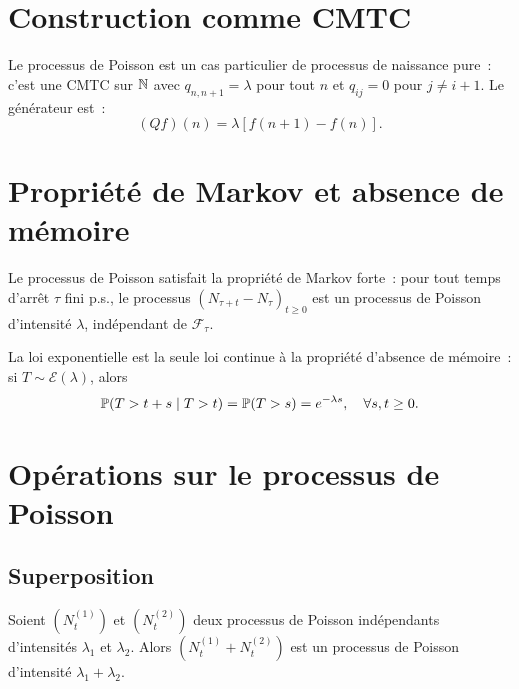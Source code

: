 \section{Construction comme CMTC}

\begin{remarque}
Le processus de Poisson est un cas particulier de processus de naissance pure~:
c'est une CMTC sur $\mathbb{N}$ avec $q_{n,n+1} = \lambda$ pour tout $n$ et
$q_{ij} = 0$ pour $j \neq i + 1$. Le g\'en\'erateur est~:
\[
  (Qf)(n) = \lambda [f(n+1) - f(n)].
\]
\end{remarque}

\section{Propri\'et\'e de Markov et absence de m\'emoire}

\begin{theoreme}
Le processus de Poisson satisfait la propri\'et\'e de Markov forte~: pour tout
temps d'arr\^et $\tau$ fini p.s., le processus $(N_{\tau+t} - N_{\tau})_{t \geq 0}$
est un processus de Poisson d'intensit\'e $\lambda$, ind\'ependant de $\mathcal{F}_{\tau}$.
\end{theoreme}

\begin{proposition}
La loi exponentielle est la seule loi continue \`a la propri\'et\'e d'absence de
m\'emoire~: si $T \sim \mathcal{E}(\lambda)$, alors
\[
  \mathbb{P}(T > t + s \mid T > t) = \mathbb{P}(T > s) = e^{-\lambda s}, \quad \forall s, t \geq 0.
\]
\end{proposition}

\section{Op\'erations sur le processus de Poisson}

\subsection{Superposition}

\begin{theoreme}[Superposition]
\label{thm:superposition}
Soient $(N_t^{(1)})$ et $(N_t^{(2)})$ deux processus de Poisson ind\'ependants
d'intensit\'es $\lambda_1$ et $\lambda_2$. Alors $(N_t^{(1)} + N_t^{(2)})$ est un
processus de Poisson d'intensit\'e $\lambda_1 + \lambda_2$.
\end{theoreme}

